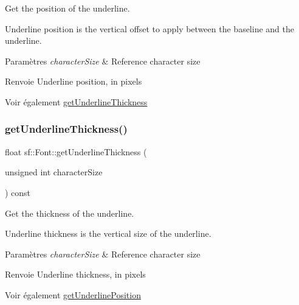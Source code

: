 Get the position of the underline. 

Underline position is the vertical offset to apply between the baseline and the underline.


\begin{DoxyParams}{Paramètres}
{\em character\+Size} & Reference character size\\
\hline
\end{DoxyParams}
\begin{DoxyReturn}{Renvoie}
Underline position, in pixels
\end{DoxyReturn}
\begin{DoxySeeAlso}{Voir également}
\hyperlink{classsf_1_1Font_ad6d0a5bc6c026fe85c239f1f822b54e6}{get\+Underline\+Thickness} 
\end{DoxySeeAlso}
\mbox{\label{classsf_1_1Font_ad6d0a5bc6c026fe85c239f1f822b54e6}} 
\subsubsection{\texorpdfstring{get\+Underline\+Thickness()}{getUnderlineThickness()}}
{\footnotesize\ttfamily float sf\+::\+Font\+::get\+Underline\+Thickness (\begin{DoxyParamCaption}\item[{unsigned int}]{character\+Size }\end{DoxyParamCaption}) const}



Get the thickness of the underline. 

Underline thickness is the vertical size of the underline.


\begin{DoxyParams}{Paramètres}
{\em character\+Size} & Reference character size\\
\hline
\end{DoxyParams}
\begin{DoxyReturn}{Renvoie}
Underline thickness, in pixels
\end{DoxyReturn}
\begin{DoxySeeAlso}{Voir également}
\hyperlink{classsf_1_1Font_a726a55f40c19ac108e348b103190caad}{get\+Underline\+Position} 
\end{DoxySeeAlso}
\mbox{\label{classsf_1_1Font_ab020052ef4e01f6c749a85571c0f3fd1}} 
